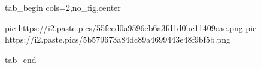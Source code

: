  
 
 
 
 


\ifcmt
  tab_begin cols=2,no_fig,center

     pic https://i2.paste.pics/55fccd0a9596eb6a3fd1d0bc11409eae.png
		 pic https://i2.paste.pics/5b579673a84dc89a4699443e48f9bf5b.png

  tab_end
\fi
